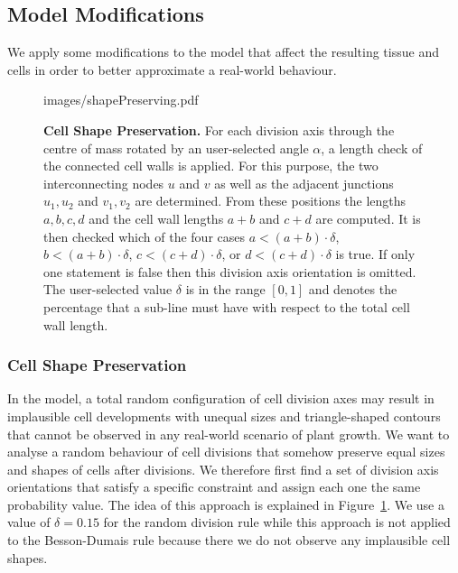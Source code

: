 \documentclass[11pt,a4paper, final]{article}
\begin{document}
\subsection{Model Modifications}
We apply some modifications to the model that affect the resulting tissue and cells in order to better approximate a real-world behaviour.
%
\begin{figure}[htbp]
	\begin{center}
		\begin{overpic}[width=0.7\linewidth]{images/shapePreserving.pdf}
		\end{overpic}
\caption[]
{
{\bf Cell Shape Preservation.} For each division axis through the centre of mass rotated by an user-selected angle $\alpha$, a length check of the connected cell walls is applied. For this purpose, the two interconnecting nodes $u$ and $v$ as well as the adjacent junctions $u_1, u_2$ and $v_1, v_2$ are determined. From these positions the lengths $a, b, c, d$ and the cell wall lengths $a+b$ and $c+d$ are computed. It is then checked which of the four cases $a < (a+b)\cdot \delta$, $b < (a+b)\cdot \delta$, $c < (c+d)\cdot \delta$, or $d < (c+d)\cdot \delta$ is true. If only one statement is false then this division axis orientation is omitted. The user-selected value $\delta$ is in the range $[0,1]$ and denotes the percentage that a sub-line must have with respect to the total cell wall length.
}
	\label{fig:shapePreserving}
	\end{center}
\end{figure}
%

\subsubsection{Cell Shape Preservation}
\label{sec:cellShape}
\noindent
In the model, a total random configuration of cell division axes may result in implausible cell developments with unequal sizes and triangle-shaped contours that cannot be observed in any real-world scenario of plant growth. We want to analyse a random behaviour of cell divisions that somehow preserve equal sizes and shapes of cells after divisions. We therefore first find a set of division axis orientations that satisfy a specific constraint and assign each one the same probability value. The idea of this approach is explained in Figure~\ref{fig:shapePreserving}. We use a value of $\delta = 0.15$ for the random division rule while this approach is not applied to the Besson-Dumais rule because there we do not observe any implausible cell shapes.
\end{document}
